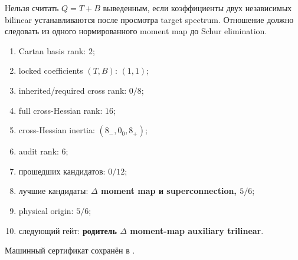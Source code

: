 \begin{nogocriterion}
Нельзя считать $Q=T+B$ выведенным, если коэффициенты двух независимых
bilinear устанавливаются после просмотра target spectrum. Отношение должно
следовать из одного нормированного moment map до Schur elimination.
\end{nogocriterion}

\begin{protocol}\begin{enumerate}
\item Cartan basis rank: \textbf{$2$};
\item locked coefficients $(T,B)$: \textbf{$(1,1)$};
\item inherited/required cross rank: \textbf{$0/8$};
\item full cross-Hessian rank: \textbf{$16$};
\item cross-Hessian inertia: \textbf{$(8_-,0_0,8_+)$};
\item audit rank: \textbf{$6$};
\item прошедших кандидатов: \textbf{$0/12$};
\item лучшие кандидаты: \textbf{$\Delta$ moment map и superconnection, $5/6$};
\item physical origin: \textbf{$5/6$};
\item следующий гейт: \textbf{родитель $\Delta$ moment-map auxiliary trilinear}.
\end{enumerate}\end{protocol}

Машинный сертификат сохранён в
.